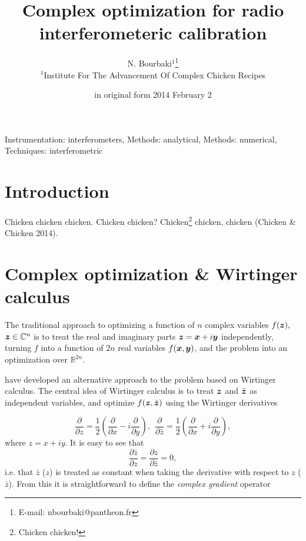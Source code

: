 \documentclass[useAMS,usenatbib]{mn2e}
\title[Complex optimization for radio interferometeric calibration]{Complex optimization for radio interferometeric calibration}
\author[N. Bourbaki]{N. Bourbaki$^1$\thanks{E-mail: nbourbaki@pantheon.fr}\\ 
$^1$Institute For The Advancement Of Complex Chicken Recipes}
\newcommand{\COMPLEX}{\mathbb{C}}
\newcommand{\REAL}{\mathbb{R}}
\newcommand{\zz}{\bmath{z}}
\begin{document}
\date{in original form 2014 February 2}

\pagerange{\pageref{firstpage}--\pageref{lastpage}} 

\maketitle

\label{firstpage}

\begin{abstract}
\end{abstract}

\begin{keywords}
Instrumentation: interferometers, Methods: analytical, Methods: numerical, Techniques: interferometric
\end{keywords}

\section{Introduction}

Chicken chicken chicken. Chicken chicken? Chicken\footnote{Chicken chicken!} chicken, chicken (Chicken \& Chicken 2014).

\section{Complex optimization \& Wirtinger calculus}

The traditional approach to optimizing a function of $n$ complex variables $f(\zz),$ $\zz\in\COMPLEX^n$ is
to treat the real and imaginary parts $\zz=\bmath{x}+i\bmath{y}$ independently, turning $f$ into a function
of $2n$ real variables $f(\bmath{x},\bmath{y})$, and the problem into an optimization over $\REAL^{2n}$.

\citet{ComplexOpt} have developed an alternative approach to the problem based on Wirtinger calculus. The central idea
of Wirtinger calculus is to treat $\zz$ and $\bar{\zz}$ as independent variables, and optimize $f(\zz,\bar{\zz})$
using the Wirtinger derivatives 

\[
\frac{\partial}{\partial z} = \frac{1}{2}\left ( \frac{\partial}{\partial x} - i\frac{\partial}{\partial y} \right),~~
\frac{\partial}{\partial \bar{z}} = \frac{1}{2}\left ( \frac{\partial}{\partial x} + i\frac{\partial}{\partial y} \right),
\]
where $z=x+iy$. It is easy to see that  
\[
\frac{\partial \bar z}{\partial z} = 
\frac{\partial z}{\partial \bar z} = 0,
\]
i.e. that $\bar z$ ($z$) is treated as constant when taking the derivative with respect to $z$ ($\bar z$). From this 
it is straightforward to define the \emph{complex gradient} operator 
\end{document}
